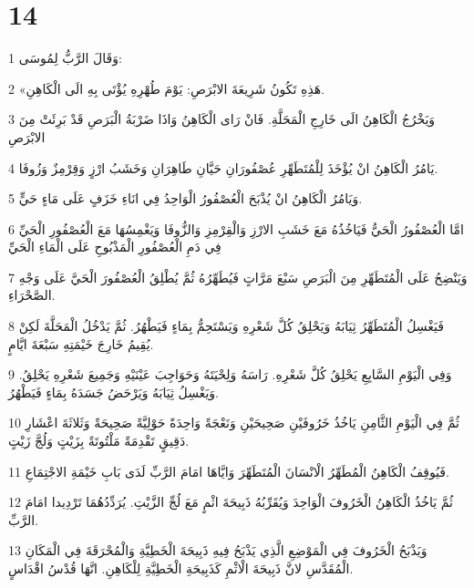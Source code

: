 \chapter{14}

\par 1 وَقَالَ الرَّبُّ لِمُوسَى:
\par 2 «هَذِهِ تَكُونُ شَرِيعَةَ الابْرَصِ: يَوْمَ طُهْرِهِ يُؤْتَى بِهِ الَى الْكَاهِنِ.
\par 3 وَيَخْرُجُ الْكَاهِنُ الَى خَارِجِ الْمَحَلَّةِ. فَانْ رَاى الْكَاهِنُ وَاذَا ضَرْبَةُ الْبَرَصِ قَدْ بَرِئَتْ مِنَ الابْرَصِ
\par 4 يَامُرُ الْكَاهِنُ انْ يُؤْخَذَ لِلْمُتَطَهِّرِ عُصْفُورَانِ حَيَّانِ طَاهِرَانِ وَخَشَبُ ارْزٍ وَقِرْمِزٌ وَزُوفَا.
\par 5 وَيَامُرُ الْكَاهِنُ انْ يُذْبَحَ الْعُصْفُورُ الْوَاحِدُ فِي انَاءِ خَزَفٍ عَلَى مَاءٍ حَيٍّ.
\par 6 امَّا الْعُصْفُورُ الْحَيُّ فَيَاخُذُهُ مَعَ خَشَبِ الارْزِ وَالْقِرْمِزِ وَالزُّوفَا وَيَغْمِسُهَا مَعَ الْعُصْفُورِ الْحَيِّ فِي دَمِ الْعُصْفُورِ الْمَذْبُوحِ عَلَى الْمَاءِ الْحَيِّ
\par 7 وَيَنْضِحُ عَلَى الْمُتَطَهِّرِ مِنَ الْبَرَصِ سَبْعَ مَرَّاتٍ فَيُطَهِّرُهُ ثُمَّ يُطْلِقُ الْعُصْفُورَ الْحَيَّ عَلَى وَجْهِ الصَّحْرَاءِ.
\par 8 فَيَغْسِلُ الْمُتَطَهِّرُ ثِيَابَهُ وَيَحْلِقُ كُلَّ شَعْرِهِ وَيَسْتَحِمُّ بِمَاءٍ فَيَطْهُرُ. ثُمَّ يَدْخُلُ الْمَحَلَّةَ لَكِنْ يُقِيمُ خَارِجَ خَيْمَتِهِ سَبْعَةَ ايَّامٍ.
\par 9 وَفِي الْيَوْمِ السَّابِعِ يَحْلِقُ كُلَّ شَعْرِهِ. رَاسَهُ وَلِحْيَتَهُ وَحَوَاجِبَ عَيْنَيْهِ وَجَمِيعَ شَعْرِهِ يَحْلِقُ. وَيَغْسِلُ ثِيَابَهُ وَيَرْحَضُ جَسَدَهُ بِمَاءٍ فَيَطْهُرُ.
\par 10 ثُمَّ فِي الْيَوْمِ الثَّامِنِ يَاخُذُ خَرُوفَيْنِ صَحِيحَيْنِ وَنَعْجَةً وَاحِدَةً حَوْلِيَّةً صَحِيحَةً وَثَلاثَةَ اعْشَارِ دَقِيقٍ تَقْدِمَةً مَلْتُوتَةً بِزَيْتٍ وَلُجَّ زَيْتٍ.
\par 11 فَيُوقِفُ الْكَاهِنُ الْمُطَهِّرُ الْانْسَانَ الْمُتَطَهِّرَ وَايَّاهَا امَامَ الرَّبِّ لَدَى بَابِ خَيْمَةِ الاجْتِمَاعِ.
\par 12 ثُمَّ يَاخُذُ الْكَاهِنُ الْخَرُوفَ الْوَاحِدَ وَيُقَرِّبُهُ ذَبِيحَةَ اثْمٍ مَعَ لُجِّ الزَّيْتِ. يُرَدِّدُهُمَا تَرْدِيدا امَامَ الرَّبِّ.
\par 13 وَيَذْبَحُ الْخَرُوفَ فِي الْمَوْضِعِ الَّذِي يَذْبَحُ فِيهِ ذَبِيحَةَ الْخَطِيَّةِ وَالْمُحْرَقَةَ فِي الْمَكَانِ الْمُقَدَّسِ لانَّ ذَبِيحَةَ الْاثْمِ كَذَبِيحَةِ الْخَطِيَّةِ لِلْكَاهِنِ. انَّهَا قُدْسُ اقْدَاسٍ.
